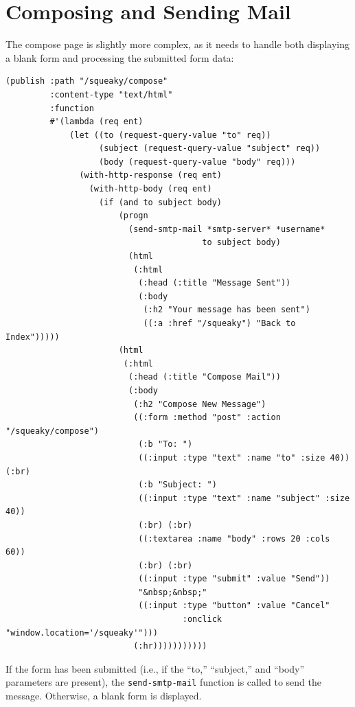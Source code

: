 \section{Composing and Sending Mail}

The compose page is slightly more complex, as it needs to handle both displaying a blank
form and processing the submitted form data:

\begin{verbatim}
(publish :path "/squeaky/compose"
         :content-type "text/html"
         :function
         #'(lambda (req ent)
             (let ((to (request-query-value "to" req))
                   (subject (request-query-value "subject" req))
                   (body (request-query-value "body" req)))
               (with-http-response (req ent)
                 (with-http-body (req ent)
                   (if (and to subject body)
                       (progn
                         (send-smtp-mail *smtp-server* *username*
                                        to subject body)
                         (html
                          (:html
                           (:head (:title "Message Sent"))
                           (:body
                            (:h2 "Your message has been sent")
                            ((:a :href "/squeaky") "Back to Index")))))
                       (html
                        (:html
                         (:head (:title "Compose Mail"))
                         (:body
                          (:h2 "Compose New Message")
                          ((:form :method "post" :action "/squeaky/compose")
                           (:b "To: ")
                           ((:input :type "text" :name "to" :size 40)) (:br)
                           (:b "Subject: ")
                           ((:input :type "text" :name "subject" :size 40))
                           (:br) (:br)
                           ((:textarea :name "body" :rows 20 :cols 60))
                           (:br) (:br)
                           ((:input :type "submit" :value "Send"))
                           "&nbsp;&nbsp;"
                           ((:input :type "button" :value "Cancel"
                                    :onclick "window.location='/squeaky'")))
                          (:hr)))))))))))
\end{verbatim}

If the form has been submitted (i.e., if the ``to,'' ``subject,'' and ``body'' parameters are present),
the \texttt{send-smtp-mail} function is called to send the message. Otherwise, a blank form is
displayed.

